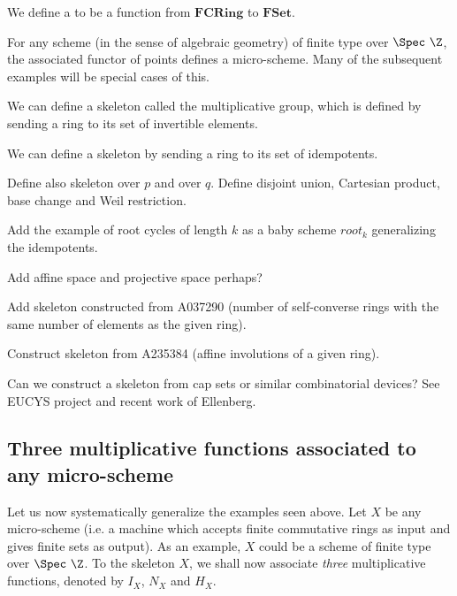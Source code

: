 \begin{definition}
We define a  to be a function from $\mathbf{FCRing}$ to $\mathbf{FSet}$.
\end{definition}

\begin{example}
For any scheme (in the sense of algebraic geometry) of finite type over $\Spec \ \Z$, the associated functor of points defines a micro-scheme. Many of the subsequent examples will be special cases of this.
\end{example}

\begin{example}
We can define a skeleton called the multiplicative group, which is defined by sending a ring to its set of invertible elements.
\end{example}


\begin{example}
We can define a skeleton by sending a ring to its set of idempotents.
\end{example}



Define also skeleton over $p$ and over $q$. Define disjoint union, Cartesian product, base change and Weil restriction.

Add the example of root cycles of length $k$ as a baby scheme $root_k$ generalizing the idempotents.

Add affine space and projective space perhaps?

Add skeleton constructed from A037290 (number of self-converse rings with the same number of elements as the given ring). 

Construct skeleton from A235384 (affine involutions of a given ring). 

Can we construct a skeleton from cap sets or similar combinatorial devices? See EUCYS project and recent work of Ellenberg. 


\subsection{Three multiplicative functions associated to any micro-scheme}



Let us now systematically generalize the examples seen above. Let $X$ be any micro-scheme (i.e. a machine which accepts finite commutative rings as input and gives finite sets as output). As an example, $X$ could be a scheme of finite type over $\Spec \ \Z$. To the skeleton $X$, we shall now associate \emph{three} multiplicative functions, denoted by $I_X$, $N_X$ and $H_X$.

